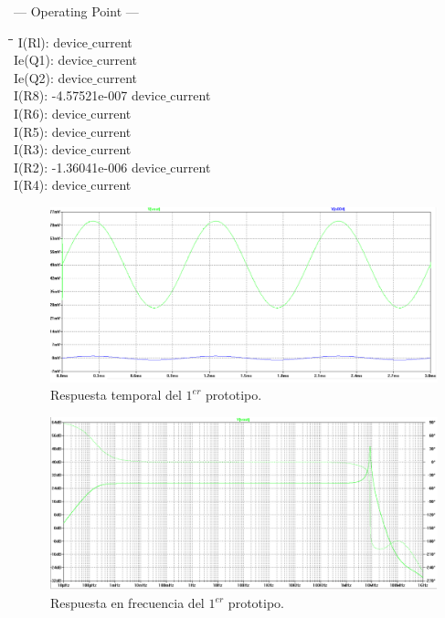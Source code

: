 \begin{center}
\parbox{0.5\textwidth}{
--- Operating Point ---
\begin{tabbing}
\hspace{3cm}\=\hspace{4cm}\=\hspace{5cm}\=\kill
I(Rl):  \>	 device$\_$current \\ 
Ie(Q1):		\> device$\_$current \\ 
Ie(Q2):		\> device$\_$current \\ 
I(R8):	\> -4.57521e-007\>	 device$\_$current \\ 
I(R6):		\> device$\_$current \\ 
I(R5):		\> device$\_$current \\ 
I(R3):		\> device$\_$current \\ 
I(R2):	\> -1.36041e-006\>	 device$\_$current \\ 
I(R4):		\> device$\_$current \\ 
\end{tabbing}
}
\end{center}

\begin{figure}[H]
\centering
\includegraphics[width=\textwidth]{img/ganancia_1er_cir.png}
\caption{Respuesta temporal del $1^{er}$ prototipo.}
\end{figure}

\begin{figure}[H]
\centering
\includegraphics[width=\textwidth]{img/cir_basico_oscilante.png}
\caption{Respuesta en frecuencia del $1^{er}$ prototipo.}
\end{figure}

